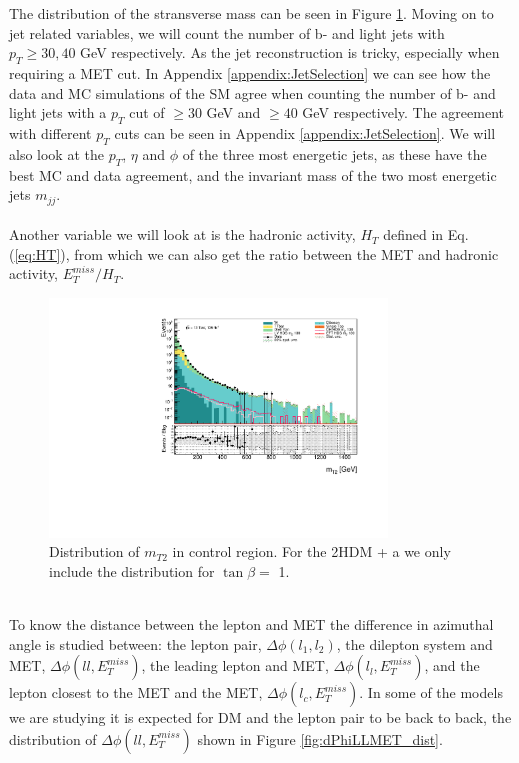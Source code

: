 \documentclass[12pt, a4paper]{book}
\begin{document}
The distribution of the stransverse mass can be seen in Figure \ref{fig:mt2_dist}. Moving on to jet related variables, we will count the number of b- and light jets with $p_T \ge 30, 40$ GeV respectively. As the jet reconstruction is tricky, 
especially when requiring a MET cut. In Appendix \ref{appendix:JetSelection} we can see how the data and MC simulations of the SM agree when counting the number of b- and light jets with a $p_T$ cut of $\ge30$ GeV and $\ge40$ GeV respectively. 
The agreement with different $p_T$ cuts can be seen in Appendix \ref{appendix:JetSelection}. We will also look at the $p_T$, $\eta$ and $\phi$ of the three most energetic jets, as these have the best MC and data agreement, and the invariant mass of the two most energetic jets $m_{jj}$.\\ 
\\Another variable we will look at is the hadronic activity, $H_T$ defined in Eq. (\ref{eq:HT}), from which we can also get the ratio between the MET and hadronic activity, $E_T^{miss}/H_T$.\\
\begin{figure}[!ht]
    \centering
        \includegraphics[width=0.8\textwidth]{mt2.pdf}
    \caption{Distribution of $m_{T2}$ in control region.  For the 2HDM + a we only include the distribution for $\tan\beta=$ 1.}\label{fig:mt2_dist}
\end{figure}
\graphicspath{{../../../Plots/Data_Analysis/SRs/Control_region/}} 
\\To know the distance between the lepton and MET the difference in azimuthal angle is studied between: the lepton pair, $\Delta\phi(l_1,l_2)$, the dilepton system and MET, $\Delta\phi(ll,E_T^{miss})$, the leading lepton and MET, $\Delta\phi(l_l,E_T^{miss})$, 
and the lepton closest to the MET and the MET, $\Delta\phi(l_c,E_T^{miss})$. In some of the models we are studying it is expected for DM and the lepton pair to be back to back, the distribution of $\Delta\phi(ll,E_T^{miss})$ shown in Figure \ref{fig:dPhiLLMET_dist}.
\end{document}
